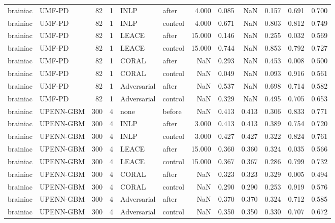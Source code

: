 \begin{tabular}{llrrllrrrrrr}
brainiac & UMF-PD & 82 & 1 & INLP & after & 4.000 & 0.085 & NaN & 0.157 & 0.691 & 0.700 \\
brainiac & UMF-PD & 82 & 1 & INLP & control & 4.000 & 0.671 & NaN & 0.803 & 0.812 & 0.749 \\
brainiac & UMF-PD & 82 & 1 & LEACE & after & 15.000 & 0.146 & NaN & 0.255 & 0.032 & 0.569 \\
brainiac & UMF-PD & 82 & 1 & LEACE & control & 15.000 & 0.744 & NaN & 0.853 & 0.792 & 0.727 \\
brainiac & UMF-PD & 82 & 1 & CORAL & after & NaN & 0.293 & NaN & 0.453 & 0.008 & 0.500 \\
brainiac & UMF-PD & 82 & 1 & CORAL & control & NaN & 0.049 & NaN & 0.093 & 0.916 & 0.561 \\
brainiac & UMF-PD & 82 & 1 & Adversarial & after & NaN & 0.537 & NaN & 0.698 & 0.714 & 0.582 \\
brainiac & UMF-PD & 82 & 1 & Adversarial & control & NaN & 0.329 & NaN & 0.495 & 0.705 & 0.653 \\
brainiac & UPENN-GBM & 300 & 4 & none & before & NaN & 0.413 & 0.413 & 0.306 & 0.833 & 0.771 \\
brainiac & UPENN-GBM & 300 & 4 & INLP & after & 3.000 & 0.413 & 0.413 & 0.389 & 0.754 & 0.720 \\
brainiac & UPENN-GBM & 300 & 4 & INLP & control & 3.000 & 0.427 & 0.427 & 0.322 & 0.824 & 0.761 \\
brainiac & UPENN-GBM & 300 & 4 & LEACE & after & 15.000 & 0.360 & 0.360 & 0.324 & 0.035 & 0.566 \\
brainiac & UPENN-GBM & 300 & 4 & LEACE & control & 15.000 & 0.367 & 0.367 & 0.286 & 0.799 & 0.732 \\
brainiac & UPENN-GBM & 300 & 4 & CORAL & after & NaN & 0.323 & 0.323 & 0.329 & 0.005 & 0.494 \\
brainiac & UPENN-GBM & 300 & 4 & CORAL & control & NaN & 0.290 & 0.290 & 0.253 & 0.919 & 0.576 \\
brainiac & UPENN-GBM & 300 & 4 & Adversarial & after & NaN & 0.370 & 0.370 & 0.324 & 0.712 & 0.585 \\
brainiac & UPENN-GBM & 300 & 4 & Adversarial & control & NaN & 0.350 & 0.350 & 0.330 & 0.707 & 0.672 \\
\bottomrule
\end{tabular}
